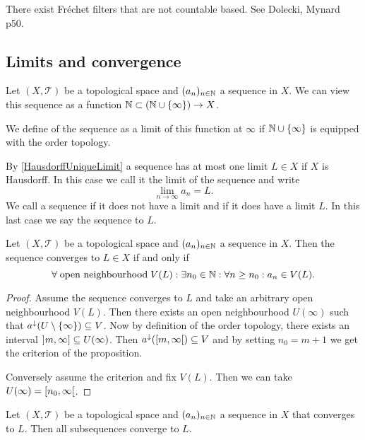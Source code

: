 \begin{example}
There exist Fréchet filters that are not countable based. See Dolecki, Mynard p50.
\end{example}


\subsection{Limits and convergence}
\begin{definition}
Let $(X,\mathcal{T})$ be a topological space and $(a_n)_{n\in\mathbb{N}}$ a sequence in $X$. We can view this sequence as a function $\mathbb{N}\subset (\mathbb{N}\cup\{\infty\})\to X$.

We define  of the sequence as a limit of this function at $\infty$ if $\mathbb{N}\cup\{\infty\}$ is equipped with the order topology.
\end{definition}
By \ref{HausdorffUniqueLimit} a sequence has at most one limit $L\in X$ if $X$ is Hausdorff. In this case we call it the limit of the sequence and write
\[ \lim_{n\to \infty}a_n = L. \]
We call a sequence  if it does not have a limit and
  if it does have a limit $L$. In this last case we say the sequence  to $L$.

\begin{proposition} \label{sequenceConvergence}
Let $(X,\mathcal{T})$ be a topological space and $(a_n)_{n\in\mathbb{N}}$ a sequence in $X$. Then the sequence converges to $L\in X$ \textup{if and only if}
\[ \forall \;\text{open neighbourhood}\; V(L): \exists n_0\in \mathbb{N}: \forall n\geq n_0: a_n\in V(L). \]
\end{proposition}
\begin{proof}
Assume the sequence converges to $L$ and take an arbitrary open neighbourhood $V(L)$. Then there exists an open neighbourhood $U(\infty)$ such that $a^{\downarrow}(U\setminus\{\infty\}) \subseteq V$. Now by definition of the order topology, there exists an interval $\interval[oc]{m, \infty}\subseteq U(\infty)$. Then $a^{\imf}(\interval[co]{m, \infty}) \subseteq V$ and by setting $n_0=m+1$ we get the criterion of the proposition.

Conversely assume the criterion and fix $V(L)$. Then we can take $U(\infty)=\interval[co]{n_0, \infty}$.
\end{proof}

\begin{lemma} \label{subsequencesConverge}
Let $(X,\mathcal{T})$ be a topological space and $(a_n)_{n\in\mathbb{N}}$ a sequence in $X$ that converges to $L$. Then all subsequences converge to $L$.
\end{lemma}

